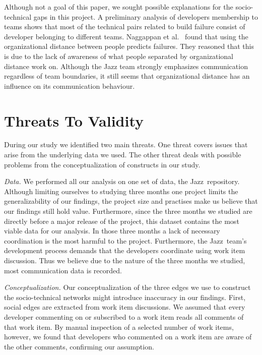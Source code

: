 \documentclass[conference]{IEEEtran}
\begin{document}
Although not a goal of this paper, we sought possible explanations for the
socio-technical gaps in this project. A preliminary analysis of developers
membership to teams shows that most
of the technical pairs related to build failure consist of developer belonging to
different teams. Naggappan et al.~\cite{nagappan:icse:2008} found that using the
organizational distance between people predicts failures. They reasoned that this
is due to the lack of awareness of what people separated by organizational distance
work on. Although the Jazz team strongly emphasizes communication
regardless of team boundaries, it still seems that organizational distance has
an influence on its communication behaviour.


\section{Threats To Validity}
\label{sec:threats}
During our study we identified two main threats. 
One threat covers issues that arise from the underlying data we used.
The other threat deals with possible problems from the conceptualization of
constructs in our study.

\emph{Data.}
We performed all our analysis on one set of data, the Jazz\texttrademark\
repository. 
Although limiting ourselves to studying three months one project limits the generalizability of our findings, the  
project size and practises make us believe that our findings still hold value.
Furthermore, since the three months  we studied are directly before a major release of the project, this dataset contains the most viable data for our analysis. In those three months a lack of necessary coordination is the most harmful to the project.
Furthermore, the Jazz\texttrademark\ team's development process demands that the developers
coordinate using work item discussion. 
Thus we believe due to the nature of the three months we studied, most communication data is recorded.

\emph{Conceptualization.}
Our conceptualization of the three edges we use to construct the socio-technical networks might introduce inaccuracy in our findings.
First, social edges are extracted from work item discussions. 
We assumed that every developer commenting on or subscribed to a work item reads all comments of that work item. 
By manual inspection of a selected number of work items, however, we found that developers who commented on a work item are aware of the other comments, confirming our assumption.
\end{document}
